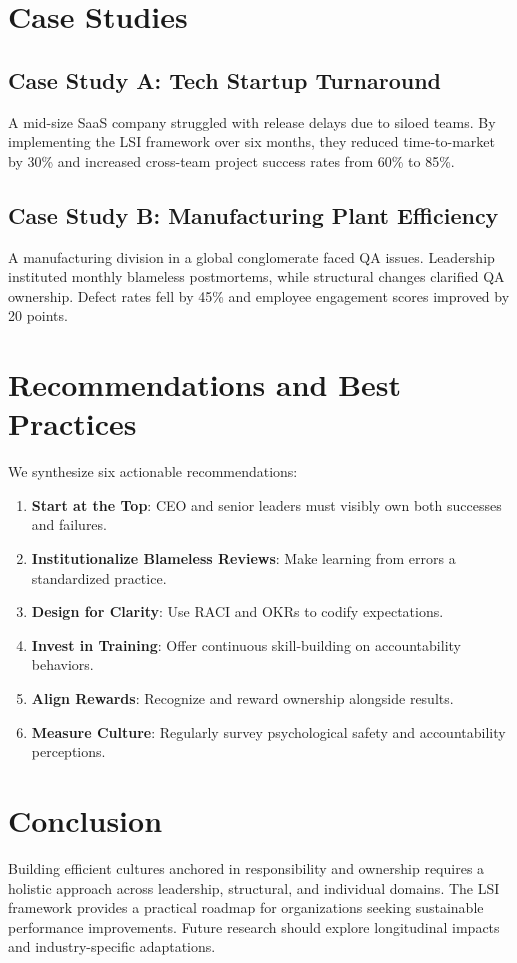 \documentclass[11pt,a4paper]{article}
\begin{document}
\section{Case Studies}\label{sec:case}
\subsection{Case Study A: Tech Startup Turnaround}
A mid-size SaaS company struggled with release delays due to siloed teams. By implementing the LSI framework over six months, they reduced time-to-market by 30\% and increased cross-team project success rates from 60\% to 85\%.

\subsection{Case Study B: Manufacturing Plant Efficiency}
A manufacturing division in a global conglomerate faced QA issues. Leadership instituted monthly blameless postmortems, while structural changes clarified QA ownership. Defect rates fell by 45\% and employee engagement scores improved by 20 points.

\section{Recommendations and Best Practices}\label{sec:recommendations}
We synthesize six actionable recommendations:
\begin{enumerate}[itemsep=0.5em]
  \item \textbf{Start at the Top}: CEO and senior leaders must visibly own both successes and failures.
  \item \textbf{Institutionalize Blameless Reviews}: Make learning from errors a standardized practice.
  \item \textbf{Design for Clarity}: Use RACI and OKRs to codify expectations.
  \item \textbf{Invest in Training}: Offer continuous skill-building on accountability behaviors.
  \item \textbf{Align Rewards}: Recognize and reward ownership alongside results.
  \item \textbf{Measure Culture}: Regularly survey psychological safety and accountability perceptions.
\end{enumerate}

\section{Conclusion}
Building efficient cultures anchored in responsibility and ownership requires a holistic approach across leadership, structural, and individual domains. The LSI framework provides a practical roadmap for organizations seeking sustainable performance improvements. Future research should explore longitudinal impacts and industry-specific adaptations.
\end{document}
